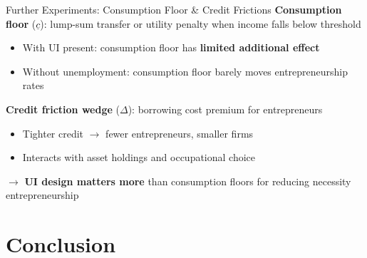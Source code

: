 \documentclass[aspectratio=169, 11pt]{beamer}
\begin{document}
\begin{frame}{Further Experiments: Consumption Floor \& Credit Frictions}
    \textbf{Consumption floor} ($\underline{c}$): lump-sum transfer or utility penalty when income falls below threshold

    \vspace{0.5em}

    \begin{itemize}
        \item With UI present: consumption floor has \textbf{limited additional effect}
        \item Without unemployment: consumption floor barely moves entrepreneurship rates
    \end{itemize}

    \vspace{1em}

    \textbf{Credit friction wedge} ($\Delta$): borrowing cost premium for entrepreneurs

    \vspace{0.5em}

    \begin{itemize}
        \item Tighter credit $\rightarrow$ fewer entrepreneurs, smaller firms
        \item Interacts with asset holdings and occupational choice
    \end{itemize}

    \vspace{1em}

    $\rightarrow$ \textbf{UI design matters more} than consumption floors for reducing necessity entrepreneurship
\end{frame}


\section{Conclusion}

\end{document}
